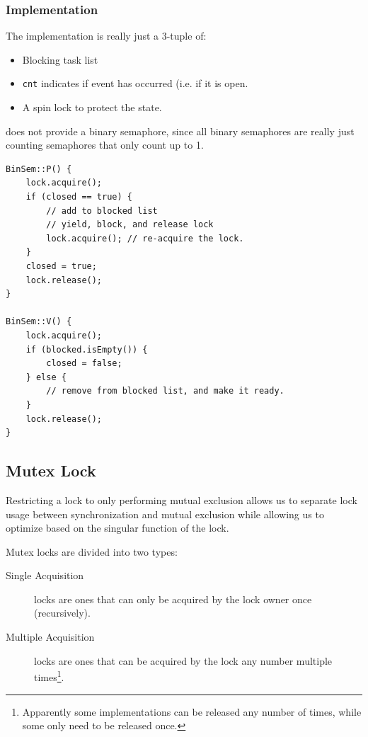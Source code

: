                 \subsubsection{Implementation} %
                \label{ssub:implementation}
                    The implementation is really just a 3-tuple of:
                    \begin{itemize}
                        \item Blocking task list
                        \item \verb|cnt| indicates if event has occurred (i.e. if it is open.
                        \item A spin lock to protect the state.
                    \end{itemize}
                    \uC does not provide a binary semaphore, since all binary semaphores are really just counting semaphores that only count up to 1.
                    \begin{lstlisting}
BinSem::P() {
    lock.acquire();
    if (closed == true) {
        // add to blocked list
        // yield, block, and release lock
        lock.acquire(); // re-acquire the lock.
    }
    closed = true;
    lock.release();
}

BinSem::V() {
    lock.acquire();
    if (blocked.isEmpty()) {
        closed = false;
    } else {
        // remove from blocked list, and make it ready.
    }
    lock.release();
}
                    \end{lstlisting}
            \subsection{Mutex Lock} %
            \label{sub:mutex_lock}
                Restricting a lock to only performing mutual exclusion allows us to separate lock usage between synchronization and mutual exclusion while allowing us to optimize based on the singular function of the lock.

                Mutex locks are divided into two types:
                \begin{description}
                    \item[Single Acquisition] locks are ones that can only be acquired by the lock owner once (recursively).
                    \item[Multiple Acquisition] locks are ones that can be acquired by the lock any number multiple times\footnote{Apparently some implementations can be released any number of times, while some only need to be released once.}.
                \end{description}
